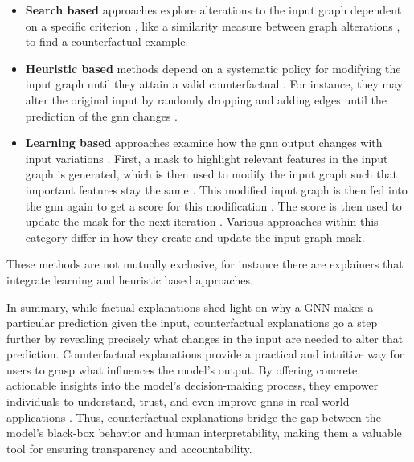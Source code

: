 \begin{itemize}
    \item \textbf{Search based} approaches explore alterations to the input graph dependent on a specific criterion \cite{prado-romero_survey_2023}, like a similarity measure between graph alterations \cite{faber_contrastive_2020}, to find a counterfactual example.
    \item \textbf{Heuristic based} methods depend on a systematic policy for modifying the input graph until they attain a valid counterfactual \cite{prado-romero_survey_2023}. For instance, they may alter the original input by randomly dropping and adding edges until the prediction of the \gls{gnn} changes \cite{abrate_counterfactual_2021}.
    \item \textbf{Learning based} approaches examine how the \gls{gnn} output changes with input variations \cite{prado-romero_survey_2023}. First, a mask to highlight relevant features in the input graph is generated, which is then used to modify the input graph such that important features stay the same \cite{prado-romero_survey_2023}. This modified input graph is then fed into the \gls{gnn} again to get a score for this modification \cite{prado-romero_survey_2023}. The score is then used to update the mask for the next iteration \cite{prado-romero_survey_2023}. Various approaches within this category differ in how they create and update the input graph mask. 
\end{itemize}

These methods are not mutually exclusive, for instance there are explainers \cite{bajaj_robust_2021} that integrate learning and heuristic based approaches.


In summary, while factual explanations shed light on why a GNN makes a particular prediction given the input, counterfactual explanations go a step further by revealing precisely what changes in the input are needed to alter that prediction. Counterfactual explanations provide a practical and intuitive way for users to grasp what influences the model's output. By offering concrete, actionable insights into the model's decision-making process, they empower individuals to understand, trust, and even improve \glspl{gnn} in real-world applications \cite{prado-romero_survey_2023}. Thus, counterfactual explanations bridge the gap between the model's black-box behavior and human interpretability, making them a valuable tool for ensuring transparency and accountability.
